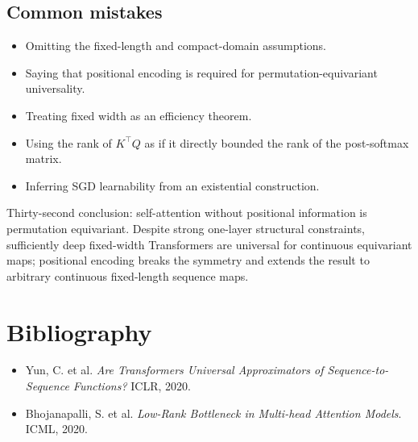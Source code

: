\documentclass[11pt,a4paper,oneside,openany]{memoir}
\theoremstyle{definition}
\begin{document}
\section{Common mistakes}
\begin{itemize}
\item Omitting the fixed-length and compact-domain assumptions.
\item Saying that positional encoding is required for permutation-equivariant universality.
\item Treating fixed width as an efficiency theorem.
\item Using the rank of $K^\top Q$ as if it directly bounded the rank of the post-softmax matrix.
\item Inferring SGD learnability from an existential construction.
\end{itemize}

\begin{presentbox}
Thirty-second conclusion: self-attention without positional information is permutation equivariant.  Despite strong one-layer structural constraints, sufficiently deep fixed-width Transformers are universal for continuous equivariant maps; positional encoding breaks the symmetry and extends the result to arbitrary continuous fixed-length sequence maps.
\end{presentbox}

\chapter*{Bibliography}
\begin{itemize}
\item Yun, C. et al. \emph{Are Transformers Universal Approximators of Sequence-to-Sequence Functions?} ICLR, 2020.
\item Bhojanapalli, S. et al. \emph{Low-Rank Bottleneck in Multi-head Attention Models}. ICML, 2020.
\end{itemize}
\end{document}
